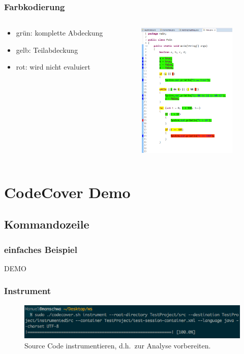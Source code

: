 \documentclass{beamer}
\begin{document}
  \begin{frame}\frametitle{Farbkodierung}
    \begin{columns}
      \begin{column}{5cm}
        \begin{itemize}
          \item grün: komplette Abdeckung
          \item gelb: Teilabdeckung
          \item rot: wird nicht evaluiert
        \end{itemize}
        \vspace{1cm}
      \end{column}
      \begin{column}{5cm}
        \begin{overprint}
          \includegraphics[height=65mm]{pictures/farben.png}
        \end{overprint}
      \end{column}
    \end{columns}
  \end{frame}

  \section{CodeCover Demo}
  \subsection{Kommandozeile}
  \begin{frame}\frametitle{einfaches Beispiel}
    \centering \Huge{DEMO}\\
  \end{frame}

	\begin{frame}\frametitle{Instrument}
    \begin{figure}%
			\includegraphics[width=\columnwidth]{pictures/demo_commandline/01_instrument.png}%
			\caption{Source Code instrumentieren, d.h.\ zur Analyse vorbereiten.}%
			\label{}%
		\end{figure}
  \end{frame}
  
\end{document}
